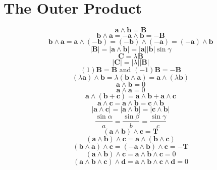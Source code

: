 \documentclass[11pt, a4paper, fleqn]{report}
\numberwithin{equation}{section}
\def\*#1{\mathbf{#1}}
\begin{document}
\section{The Outer Product}
\begin{equation}
    \*a \wedge \*b=\*B
\end{equation}
\begin{equation}
    \*b\wedge\*a=-\*a \wedge \*b=-\*B
\end{equation}
\begin{equation}
    \*b \wedge \*a=\*a \wedge(-\*b)=(-\*b)\wedge(-\*a)=(-\*a)\wedge\*b
\end{equation}
\begin{equation}
    |\*B|=|\*a\wedge\*b|=|\*a||\*b|\sin\gamma
\end{equation}
\begin{equation}
    \*C=\lambda\*B
\end{equation}
\begin{equation}
    |\*C|=|\lambda||\*B|
\end{equation}
\begin{equation}
    (1)\*B=\*B\textrm{ and }(-1)\*B=-\*B
\end{equation}
\begin{equation}
    (\lambda\*a)\wedge\*b=\lambda(\*b\wedge\*a)=\*a\wedge(\lambda\*b)
\end{equation}
\begin{equation}
    \*a\wedge\*b=0
\end{equation}
\begin{equation}
    \*a\wedge\*a=0
\end{equation}
\begin{equation}
    \*a\wedge(\*b+\*c)=\*a\wedge\*b+\*a\wedge\*c
\end{equation}
\begin{equation}
    \*a\wedge\*c=\*a\wedge\*b=\*c\wedge\*b
\end{equation}
\begin{equation}
    |\*a\wedge\*c|=|\*a\wedge\*b|=|\*c\wedge\*b|
\end{equation}
\begin{equation}
    \frac{\sin\alpha}{a} =\frac{\sin\beta}{b}=\frac{\sin\gamma}{c}
\end{equation}
\begin{equation}
    (\*a\wedge\*b)\wedge\*c=\*T
\end{equation}
\begin{equation}
    (\*a\wedge\*b)\wedge\*c=\*a\wedge(\*b\wedge\*c)
\end{equation}
\begin{equation}
    (\*b\wedge\*a)\wedge\*c=(-\*a\wedge\*b)\wedge\*c=-\*T
\end{equation}
\begin{equation}
    (\*a\wedge\*b)\wedge\*c=\*a\wedge\*b\wedge\*c=0
\end{equation}
\begin{equation}
    (\*a\wedge\*b\wedge\*c)\wedge\*d=\*a\wedge\*b\wedge\*c\wedge\*d=0
\end{equation}
\end{document}
